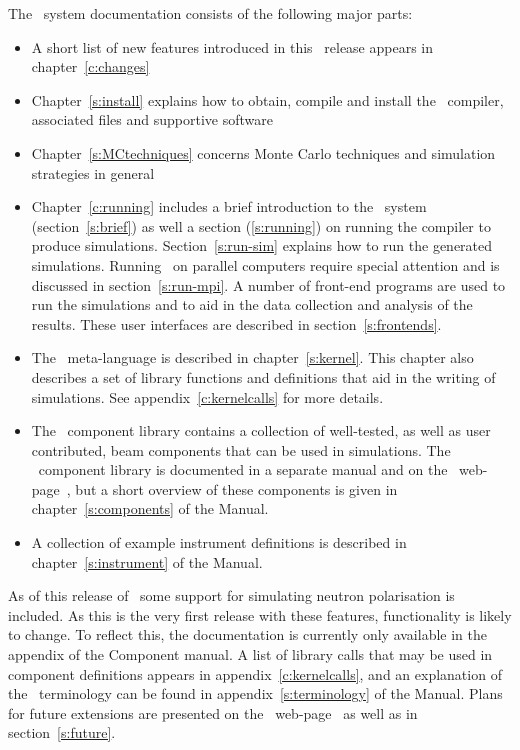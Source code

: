 The \MCX\ system documentation consists of the following major
parts:
\begin{itemize}
\item A short list of new features introduced in this \MCX\ release
  appears in chapter~\ref{c:changes}
\item Chapter~\ref{s:install} explains how to obtain, compile
  and install the \MCX\ compiler, associated files and supportive software
\item Chapter~\ref{s:MCtechniques} concerns Monte Carlo techniques
  and simulation strategies in general
\item Chapter~\ref{c:running} includes a brief introduction to the
  \MCX\ system
  (section~\ref{s:brief}) as well a section (\ref{s:running}) on running the compiler to produce
  simulations. Section~\ref{s:run-sim} explains how to run the generated
  simulations. Running \MCX\ on parallel computers require special
  attention and is discussed in section~\ref{s:run-mpi}. A number of front-end programs are used to run the
  simulations and to aid in the data collection and analysis of the
  results. These user interfaces are described in section~\ref{s:frontends}.
\item The \MCX\ meta-language is described in chapter~\ref{s:kernel}. This
  chapter also describes a set of library functions and definitions
  that aid in the writing of simulations. See
  appendix~\ref{c:kernelcalls} for more details.
\item The \MCX\ component library contains a collection of
  well-tested, as well as user contributed, beam components that can be used in simulations.
  The \MCX\ component library is documented in a separate manual
  and on the \MCX\ web-page~\cite{mcxtrace_webpage}, but a short overview of these
  components is given in chapter~\ref{s:components} of the Manual.
\item A collection of example instrument definitions is described in
  chapter~\ref{s:instrument} of the Manual.%

\end{itemize}

As of this release of \MCX\, some support for simulating neutron
polarisation is included. As this is the very first release with these
features, functionality is likely to change. To reflect this, the
documentation is currently only available in the appendix of the Component manual. %
A list of library calls that may be used in component definitions
appears in appendix~\ref{c:kernelcalls}, and
an explanation of the \MCX\ terminology can be
found in appendix~\ref{s:terminology} of the Manual.
Plans for future extensions are presented on the \MCX\ web-page~\cite{mcxtrace_webpage} as well as in section~\ref{s:future}.


